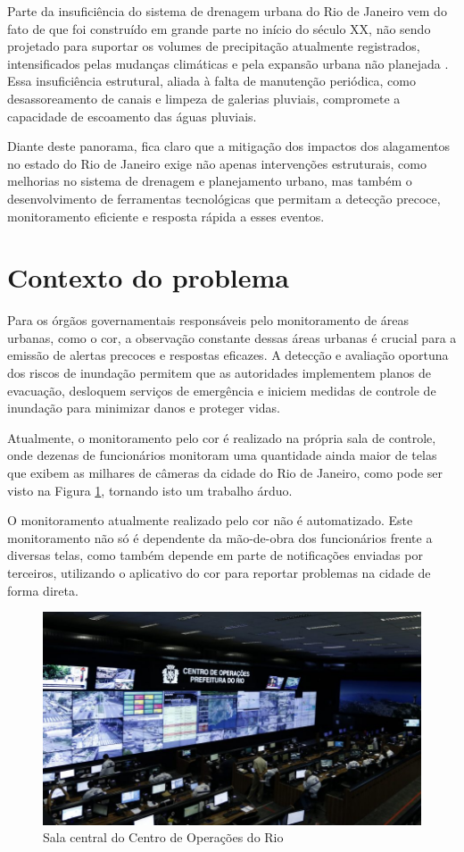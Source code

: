 Parte da insuficiência do sistema de drenagem urbana do Rio de Janeiro vem do fato de que foi construído em grande parte no início do século XX,
não sendo projetado para suportar os volumes de precipitação atualmente registrados, intensificados pelas mudanças climáticas e pela expansão urbana não planejada \cite{planodiretor}.
Essa insuficiência estrutural, aliada à falta de manutenção periódica, como desassoreamento de canais e limpeza de galerias pluviais, compromete a capacidade de escoamento das águas pluviais.

Diante deste panorama, fica claro que a mitigação dos impactos dos alagamentos no estado do Rio de Janeiro exige não apenas intervenções estruturais,
como melhorias no sistema de drenagem e planejamento urbano, mas também o desenvolvimento de ferramentas tecnológicas que permitam a detecção precoce, monitoramento eficiente e resposta rápida a esses eventos.

\section{Contexto do problema}

Para os órgãos governamentais responsáveis pelo monitoramento de áreas urbanas, como o \acrfull{cor}, a observação constante dessas áreas urbanas é crucial para a emissão de alertas precoces e respostas eficazes.
A detecção e avaliação oportuna dos riscos de inundação permitem que as autoridades implementem planos de evacuação, desloquem serviços de emergência e iniciem medidas de controle de inundação para minimizar danos e proteger vidas.

Atualmente, o monitoramento pelo \acrshort{cor} é realizado na própria sala de controle, onde dezenas de funcionários monitoram uma quantidade ainda maior de telas que exibem as milhares de câmeras da cidade do Rio de Janeiro, como pode ser visto na Figura \ref{fig:cor}, tornando isto um trabalho árduo.

O monitoramento atualmente realizado pelo \acrshort{cor} não é automatizado. Este monitoramento não só é dependente da mão-de-obra dos funcionários frente a diversas telas, como também depende em parte de notificações enviadas por terceiros, utilizando o aplicativo do \acrshort{cor} para reportar problemas na cidade de forma direta.

\begin{figure}[htb]
\centerline{\includegraphics[width=0.9\linewidth]{images/46627458084_451cf87027_k.jpg}}
\caption{Sala central do Centro de Operações do Rio}
\label{fig:cor}
\end{figure}

